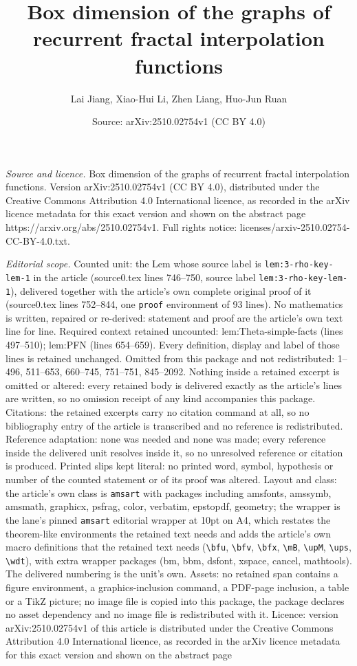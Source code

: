 \documentclass[10pt,a4paper]{amsart}
\title[Box dimension of the graphs of recurrent fractal interpolati]{Box dimension of the graphs of recurrent fractal interpolation functions}
\author{Lai Jiang, Xiao-Hui Li, Zhen Liang, Huo-Jun Ruan}
\date{Source: arXiv:2510.02754v1 (CC BY 4.0)}
\begin{document}
\maketitle

\noindent\emph{Source and licence.} Box dimension of the graphs of recurrent fractal interpolation functions. Version arXiv:2510.02754v1 (CC BY 4.0), distributed under the Creative Commons Attribution 4.0 International licence, as recorded in the arXiv licence metadata for this exact version and shown on the abstract page https://arxiv.org/abs/2510.02754v1. Full rights notice: licenses/arxiv-2510.02754-CC-BY-4.0.txt.\par\smallskip

\noindent\textit{Editorial scope.} Counted unit: the Lem whose source label is \texttt{lem:3-rho-key-lem-1} in the article (source0.tex lines 746--750, source label \texttt{lem:3-rho-key-lem-1}), delivered together with the article's own complete original proof of it (source0.tex lines 752--844, one \texttt{proof} environment of 93 lines). No mathematics is written, repaired or re-derived: statement and proof are the article's own text line for line. Required context retained uncounted: lem:Theta-simple-facts (lines 497--510); lem:PFN (lines 654--659). Every definition, display and label of those lines is retained unchanged. Omitted from this package and not redistributed: 1--496, 511--653, 660--745, 751--751, 845--2092. Nothing inside a retained excerpt is omitted or altered: every retained body is delivered exactly as the article's lines are written, so no omission receipt of any kind accompanies this package. Citations: the retained excerpts carry no citation command at all, so no bibliography entry of the article is transcribed and no reference is redistributed. Reference adaptation: none was needed and none was made; every reference inside the delivered unit resolves inside it, so no unresolved reference or citation is produced. Printed slips kept literal: no printed word, symbol, hypothesis or number of the counted statement or of its proof was altered. Layout and class: the article's own class is \texttt{amsart} with packages including amsfonts, amssymb, amsmath, graphicx, psfrag, color, verbatim, epstopdf, geometry; the wrapper is the lane's pinned \texttt{amsart} editorial wrapper at 10pt on A4, which restates the theorem-like environments the retained text needs and adds the article's own macro definitions that the retained text needs (\texttt{\textbackslash bfu}, \texttt{\textbackslash bfv}, \texttt{\textbackslash bfx}, \texttt{\textbackslash mB}, \texttt{\textbackslash upM}, \texttt{\textbackslash ups}, \texttt{\textbackslash wdt}), with extra wrapper packages (bm, bbm, dsfont, xspace, cancel, mathtools). The delivered numbering is the unit's own. Assets: no retained span contains a figure environment, a graphics-inclusion command, a PDF-page inclusion, a table or a TikZ picture; no image file is copied into this package, the package declares no asset dependency and no image file is redistributed with it. Licence: version arXiv:2510.02754v1 of this article is distributed under the Creative Commons Attribution 4.0 International licence, as recorded in the arXiv licence metadata for this exact version and shown on the abstract page 
\end{document}
